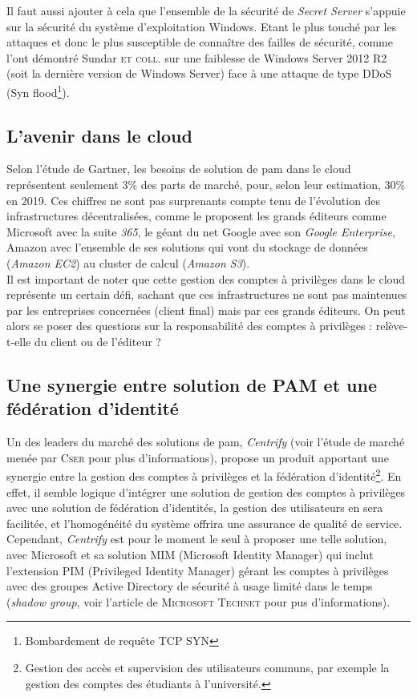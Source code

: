 Il faut aussi ajouter à cela que l'ensemble de la sécurité de \emph{Secret Server} s'appuie sur la sécurité du système d'exploitation Windows. Etant le plus touché par les attaques et donc le plus susceptible de connaître des failles de sécurité, comme l'ont démontré Sundar \textsc{et coll.}\cite{skk} sur une faiblesse de Windows Server 2012 R2 (soit la dernière version de Windows Server) face à une attaque de type DDoS (Syn flood\footnote{Bombardement de requête TCP SYN}).

\subsection{L'avenir dans le cloud}
\label{subsec:avenircloud}

Selon l'étude de Gartner\cite{gar}, les besoins de solution de \gls{pam} dans le cloud représentent seulement 3\% des parts de marché, pour, selon leur estimation, 30\% en 2019. Ces chiffres ne sont pas surprenants compte tenu de l'évolution des infrastructures décentralisées, comme le proposent les grands éditeurs comme Microsoft avec la suite \emph{365}, le géant du net Google avec son \emph{Google Enterprise}, Amazon avec l'ensemble de ses solutions qui vont du stockage de données (\emph{Amazon EC2}) au cluster de calcul (\emph{Amazon S3}).\\
Il est important de noter que cette gestion des comptes à privilèges dans le cloud représente un certain défi, sachant que ces infrastructures ne sont pas maintenues par les entreprises concernées (client final) mais par ces grands éditeurs. On peut alors se poser des questions sur la responsabilité des comptes à privilèges : relève-t-elle du client ou de l'éditeur ?

\subsection{Une synergie entre solution de PAM et une fédération d'identité}
\label{subsec:syner}

Un des leaders du marché des solutions de \gls{pam}, \emph{Centrify} (voir l'étude de marché menée par \textsc{Cser} \cite{acs} pour plus d'informations), propose un produit apportant une synergie entre la gestion des comptes à privilèges et la fédération d'identité\footnote{Gestion des accès et supervision des utilisateurs communs, par exemple la gestion des comptes des étudiants à l'université.}. En effet, il semble logique d'intégrer une solution de gestion des comptes à privilèges avec une solution de fédération d'identités, la gestion des utilisateurs en sera facilitée, et l’homogénéité du système offrira une assurance de qualité de service. Cependant, \emph{Centrify} est pour le moment le seul à proposer une telle solution, avec Microsoft et sa solution MIM (Microsoft Identity Manager) qui inclut l'extension PIM (Privileged Identity Manager) gérant les comptes à privilèges avec des groupes Active Directory de sécurité à usage limité dans le temps (\emph{shadow group}, voir l'article de \textsc{Microsoft Technet} \cite{mic} pour pus d'informations).

